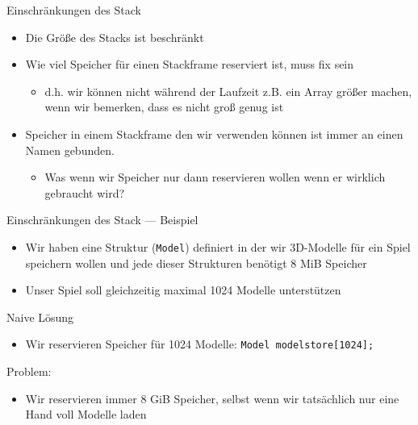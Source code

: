 \documentclass[presentation]{beamer}
\begin{document}
\begin{frame}[label={sec:orge0116cb}]{Einschränkungen des Stack}
\begin{itemize}
\item Die \alert{Größe} des Stacks ist \alert{beschränkt}
\item \alert{Wie viel Speicher} für einen Stackframe reserviert ist, muss \alert{fix} sein
\begin{itemize}
\item d.h. wir können nicht während der Laufzeit z.B. ein Array größer
machen, wenn wir bemerken, dass es nicht groß genug ist
\end{itemize}
\item Speicher in einem Stackframe den wir verwenden können ist \alert{immer an
einen Namen} gebunden.
\begin{itemize}
\item Was wenn wir Speicher nur dann reservieren wollen wenn er
\alert{wirklich gebraucht wird}?
\end{itemize}
\end{itemize}
\end{frame}
\begin{frame}[label={sec:org2a2231b},fragile]{Einschränkungen des Stack --- Beispiel}
 \begin{itemize}
\item Wir haben eine Struktur ({\color{solarizedYellow}\texttt{Model}}) definiert in der wir 3D-Modelle
für ein Spiel speichern wollen und jede dieser Strukturen benötigt
8 MiB Speicher
\item Unser Spiel soll gleichzeitig maximal 1024 Modelle unterstützen
\end{itemize}
\begin{exampleblock}{Naive Lösung}
\begin{itemize}
\item Wir reservieren Speicher für 1024 Modelle: {\color{solarizedYellow}\texttt{Model modelstore[1024];}}
\end{itemize}
\alert{Problem:}
\begin{itemize}
\item Wir reservieren immer 8 GiB Speicher, selbst wenn wir tatsächlich
nur eine Hand voll Modelle laden
\end{itemize}
\end{exampleblock}
\end{frame}
\end{document}
